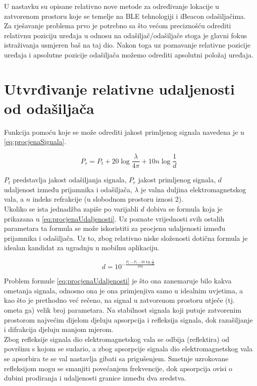 U nastavku su opisane relativno nove metode za određivanje lokacije u zatvorenom prostoru koje se temelje na BLE tehnologiji i iBeacon odašiljačima.
Za rješavanje problema prvo je potrebno sa što većom preciznošću odrediti relativnu poziciju uređaja u odnosu na odašiljač/odašiljače stoga je glavni fokus istraživanja usmjeren baš na taj dio. 
Nakon toga uz poznavanje relativne pozicije uređaja i apsolutne pozicije odašiljača možemo odrediti apsolutni položaj uređaja.

\section{Utvrđivanje relativne udaljenosti od odašiljača}

Funkcija pomoću koje se može odrediti jakost primljenog signala navedena je u \eqref{eq:procjenaSignala}.

\begin{equation}
	\label{eq:procjenaSignala}
	P_r = P_t + 20\log{\frac{\lambda}{4\pi}} + 10n\log{\frac{1}{d}}
\end{equation}

$P_t$ predstavlja jakost odašiljanja signala, $P_r$ jakost primljenog signala, $d$ udaljenost između prijamnika i odašiljača, $\lambda$ je valna duljina elektromagnetskog vala, a $n$ indeks refrakcije (u slobodnom prostoru iznosi 2).
\\

Ukoliko se ista jednadžba zapiše po varijabli $d$ dobiva se formula koja je prikazana u \eqref{eq:procjenaUdaljenosti}. 
Uz poznate vrijednosti svih ostalih parametara ta formula se može iskoristiti za procjenu udaljenosti između prijamnika i odašiljača.
Uz to, zbog relativno niske složenosti dotična formula je idealan kandidat za ugradnju u mobilnu aplikaciju.

\begin{equation}
	\label{eq:procjenaUdaljenosti}
	d = 10^{-\frac{P_r - P_t - 20\log{\frac{\lambda}{4\pi}}}{10n}}
\end{equation}

Problem formule \eqref{eq:procjenaUdaljenosti} je što ona zanemaruje bilo kakva ometanja signala, odnosno ona je ona primjenjiva samo u idealnim uvjetima, a kao što je prethodno već rečeno, na signal u zatvorenom prostoru utječe (tj. ometa ga) velik broj parametara. 
Na stabilnost signala koji putuje zatvorenim prostorom najvećim dijelom djeluju apsorpcija i refleksija signala, dok razašiljanje i difrakcija djeluju manjom mjerom.
\\
Zbog refleksije signala dio elektromagnetskog vala se odbija (reflektira) od površinu s kojom se sudario, a zbog apsorpcije signala dio elektromagnetskog vala se apsorbira te se val nastavlja gibati sa prigušenjem. 
Smetnje uzrokovane refleksijom mogu se smanjiti povećanjem frekvencije, dok apsorpcija ovisi o dubini prodiranja i udaljenosti granice između dva sredstva. 
\\


